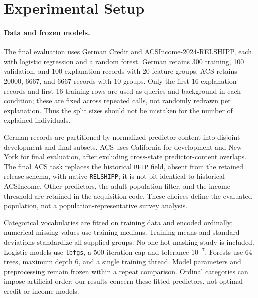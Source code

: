 \documentclass{article}
\begin{document}
\section{Experimental Setup}
\paragraph{Data and frozen models.}
The final evaluation uses German Credit and ACSIncome-2024-RELSHIPP, each with logistic regression and a random forest. German retains 300 training, 100 validation, and 100 explanation records with 20 feature groups. ACS retains 20000, 6667, and 6667 records with 10 groups. Only the first 16 explanation records and first 16 training rows are used as queries and background in each condition; these are fixed across repeated calls, not randomly redrawn per explanation. Thus the split sizes should not be mistaken for the number of explained individuals.

German records are partitioned by normalized predictor content into disjoint development and final subsets. ACS uses California for development and New York for final evaluation, after excluding cross-state predictor-content overlaps. The final ACS task replaces the historical \texttt{RELP} field, absent from the retained release schema, with native \texttt{RELSHIPP}; it is not bit-identical to historical ACSIncome. Other predictors, the adult population filter, and the income threshold are retained in the acquisition code. These choices define the evaluated population, not a population-representative survey analysis.

Categorical vocabularies are fitted on training data and encoded ordinally; numerical missing values use training medians. Training means and standard deviations standardize all supplied groups. No one-hot masking study is included. Logistic models use \texttt{lbfgs}, a 500-iteration cap and tolerance $10^{-7}$. Forests use 64 trees, maximum depth 6, and a single training thread. Model parameters and preprocessing remain frozen within a repeat comparison. Ordinal categories can impose artificial order; our results concern these fitted predictors, not optimal credit or income models.
\end{document}
